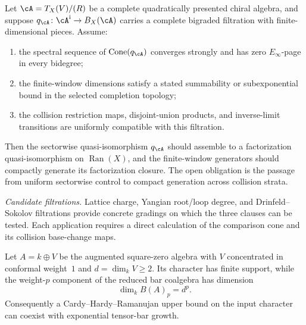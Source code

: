 \begin{conjecture}\label{conj:factorization-finiteness-criterion}
Let $\cA=T_X(V)/(R)$ be a complete quadratically presented chiral
algebra, and suppose
$q_\cA\colon\cA^{\mathrm i}\to B_X(\cA)$ carries a complete
bigraded filtration with finite-dimensional pieces.  Assume:
\begin{enumerate}[label=\textup{(\roman*)}]
\item the spectral sequence of
$\operatorname{Cone}(q_\cA)$ converges strongly and has zero
$E_\infty$-page in every bidegree;
\item the finite-window dimensions satisfy a stated summability or
subexponential bound in the selected completion topology;
\item the collision restriction maps, disjoint-union products, and
inverse-limit transitions are uniformly compatible with this
filtration.
\end{enumerate}
Then the sectorwise quasi-isomorphism $q_\cA$ should assemble to a
factorization quasi-isomorphism on $\operatorname{Ran}(X)$, and the
finite-window generators should compactly generate its factorization
closure.  The open obligation is the passage from uniform sectorwise
control to compact generation across collision strata.

\emph{Candidate filtrations.}
Lattice charge, Yangian root/loop degree, and Drinfeld--Sokolov
filtrations provide concrete gradings on which the three clauses can
be tested.  Each application requires a direct calculation of the
comparison cone and its collision base-change maps.
\end{conjecture}

\begin{proposition}%
\label{prop:subexponential-growth-automatic}%
%
Let $A=k\oplus V$ be the augmented square-zero algebra with
$V$ concentrated in conformal weight~$1$ and
$d=\dim_kV\geq2$.  Its character has finite support, while the
weight-$p$ component of the reduced bar coalgebra has dimension
\begin{equation}\label{eq:bar-dim-bound}
 \dim_k B(A)_p=d^p.
\end{equation}
Consequently a Cardy--Hardy--Ramanujan upper bound on the input
character can coexist with exponential tensor-bar growth.
\end{proposition}

